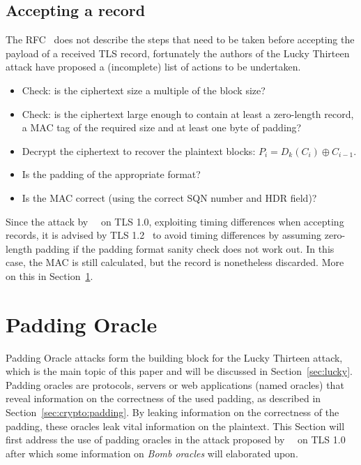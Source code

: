 \documentclass[10pt,conference,a4paper]{IEEEtran}
\begin{document}
\subsection{Accepting a record}
\label{sec:tls:accepting}
The RFC~\cite{ietf2008transport} does not describe the steps that need to be taken before accepting the payload of a received TLS record, fortunately the authors of the Lucky Thirteen attack have proposed a (incomplete) list of actions to be undertaken.
\begin{itemize}
  \item Check: is the ciphertext size a multiple of the block size?
  \item Check: is the ciphertext large enough to contain at least a zero-length record, a MAC tag of the required size and at least one byte of padding?
  \item Decrypt the ciphertext to recover the plaintext blocks: $P_i = D_k(C_i) \oplus C_{i-1}$.
  \item Is the padding of the appropriate format?
  \item Is the MAC correct (using the correct SQN number and HDR field)?
\end{itemize}
Since the attack by~\citeauthor{vaudenay2002security}~\cite{vaudenay2002security} on TLS 1.0, exploiting timing differences when accepting records, it is advised by TLS 1.2~\cite{ietf2008transport} to avoid timing differences by assuming zero-length padding if the padding format sanity check does not work out. In this case, the MAC is still calculated, but the record is nonetheless discarded. More on this in Section~\ref{sec:paddingoracle}.



\section{Padding Oracle}
\label{sec:paddingoracle}
Padding Oracle attacks form the building block for the Lucky Thirteen attack, which is the main topic of this paper and will be discussed in Section~\ref{sec:lucky}. Padding oracles are protocols, servers or web applications (named oracles) that reveal information on the correctness of the used padding, as described in Section~\ref{sec:crypto:padding}. By leaking information on the correctness of the padding, these oracles leak vital information on the plaintext. This Section will first address the use of padding oracles in the attack proposed by~\citeauthor{vaudenay2002security}~\cite{vaudenay2002security} on TLS 1.0~\cite{dierks1999rfc} after which some information on \textit{Bomb oracles} will elaborated upon.
\end{document}
